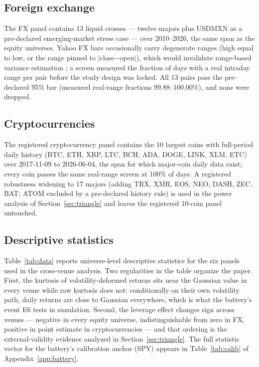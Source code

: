 \documentclass[11pt]{article}
\begin{document}
\subsection{Foreign exchange}
\label{sec:data:fx}

The FX panel contains 13 liquid crosses --- twelve majors plus USDMXN as a
pre-declared emerging-market stress case --- over 2010--2026, the same span
as the equity universes. Yahoo FX bars occasionally carry degenerate ranges
(high equal to low, or the range pinned to $|$close$-$open$|$), which would
invalidate range-based variance estimation \citep{garman1980}; a screen
measured the fraction
of days with a real intraday range per pair before the study design was
locked. All 13 pairs pass the pre-declared 95\% bar (measured real-range
fractions 99.88--100.00\%), and none were dropped.

\subsection{Cryptocurrencies}
\label{sec:data:crypto}

The registered cryptocurrency panel contains the 10 largest coins with
full-period daily history (BTC, ETH, XRP, LTC, BCH, ADA, DOGE, LINK, XLM,
ETC) over 2017-11-09 to 2026-06-04, the span for which major-coin daily
data exist; every coin passes the same real-range screen at 100\% of days.
A registered robustness widening to 17 majors (adding TRX, XMR, EOS, NEO,
DASH, ZEC, BAT; ATOM excluded by a pre-declared history rule) is used in
the power analysis of Section~\ref{sec:triangle} and leaves the registered
10-coin panel untouched.

\subsection{Descriptive statistics}
\label{sec:data:desc}

Table~\ref{tab:data} reports universe-level descriptive statistics for the
six panels used in the cross-venue analysis. Two regularities in the table
organize the paper. First, the kurtosis of volatility-deformed returns sits
near the Gaussian value in every venue while raw kurtosis does not:
conditionally on their own volatility path, daily returns are close to
Gaussian everywhere, which is what the battery's event E6 tests in
simulation. Second, the leverage effect changes sign across venues ---
negative in every equity universe, indistinguishable from zero in FX,
positive in point estimate in cryptocurrencies --- and that ordering is the
external-validity evidence analyzed in Section~\ref{sec:triangle}. The full
statistic vector for the battery's calibration anchor (SPY) appears in
Table~\ref{tab:calib} of Appendix~\ref{app:battery}.
\end{document}
